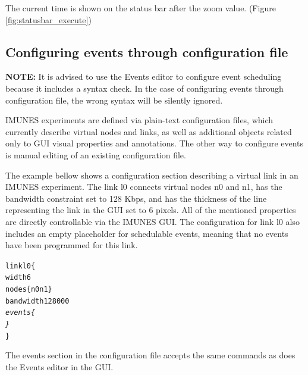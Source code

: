 The current time is shown on the status bar after the zoom value. (Figure
\ref{fig:statusbar_execute})

\subsection{Configuring events through configuration file}
\textbf{NOTE:} It is advised to use the Events editor to configure event
scheduling because it includes a syntax check. In the case of configuring
events through configuration file, the wrong syntax will be silently ignored.

IMUNES experiments are defined via plain-text configuration files, which
currently describe virtual nodes and links, as well as additional objects
related only to GUI visual properties and annotations. The other way to
configure events is manual editing of an existing configuration file.

The example bellow shows a configuration section describing a virtual link in
an IMUNES experiment. The link l0 connects virtual nodes n0 and n1, has the
bandwidth constraint set to 128 Kbps, and has the thickness of the line
representing the link in the GUI set to 6 pixels. All of the mentioned
properties are directly controllable via the IMUNES GUI. The configuration for
link l0 also includes an empty placeholder for schedulable events, meaning that
no events have been programmed for this link.

\begin{alltt}
link l0 \{
    width 6
    nodes \{n0 n1\}
    bandwidth 128000
    \emph{events \{}
    \emph{\}}
\}
\end{alltt}

The events section in the configuration file accepts the same commands as does
the Events editor in the GUI.

